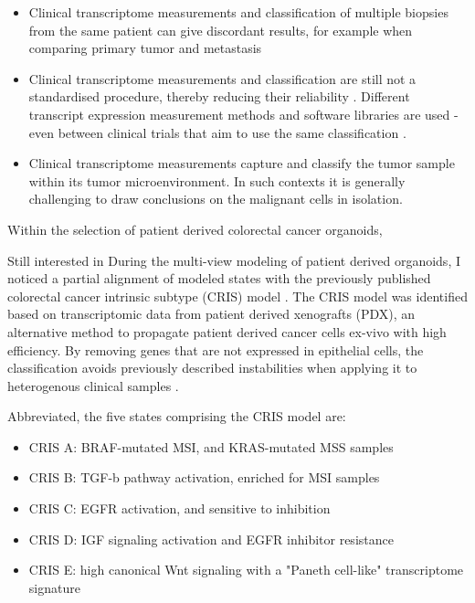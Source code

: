 \begin{flushleft}
\begin{itemize} 
    \item Clinical transcriptome measurements and classification of multiple biopsies from the same patient can give discordant results, for example when comparing primary tumor and metastasis \citep{eideMetastaticHeterogeneityConsensus2021}  
    \item Clinical transcriptome measurements and classification are still not a standardised procedure, thereby reducing their reliability \citep{sveenPredictiveModelingColorectal2019}. Different transcript expression measurement methods and software libraries are used - even between clinical trials that aim to use the same classification \citep{stintzingConsensusMolecularSubgroups2019, lenzImpactConsensusMolecular2019}.
    \item Clinical transcriptome measurements capture and classify the tumor sample within its tumor microenvironment. In such contexts it is generally challenging to draw conclusions on the malignant cells in isolation.
\end{itemize}

Within the selection of patient derived colorectal cancer organoids, 

Still interested in 
During the multi-view modeling of patient derived organoids, I noticed a partial alignment of modeled states with the previously published colorectal cancer intrinsic subtype (CRIS) model \citep{isellaSelectiveAnalysisCancercell2017a}. The CRIS model was identified based on transcriptomic data from patient derived xenografts (PDX), an alternative method to propagate patient derived cancer cells ex-vivo with high efficiency. By removing genes that are not expressed in epithelial cells, the classification avoids previously described instabilities when applying it to heterogenous clinical samples \citep{dunneCancercellIntrinsicGene2017}.

Abbreviated, the five states comprising the CRIS model are: 
\begin{itemize} 
    \item CRIS A: BRAF-mutated MSI, and KRAS-mutated MSS samples
    \item CRIS B: TGF-b pathway activation, enriched for MSI samples 
    \item CRIS C: EGFR activation, and sensitive to inhibition
    \item CRIS D: IGF signaling activation and EGFR inhibitor resistance
    \item CRIS E: high canonical Wnt signaling with a "Paneth cell-like" transcriptome signature
\end{itemize}


\end{flushleft}
